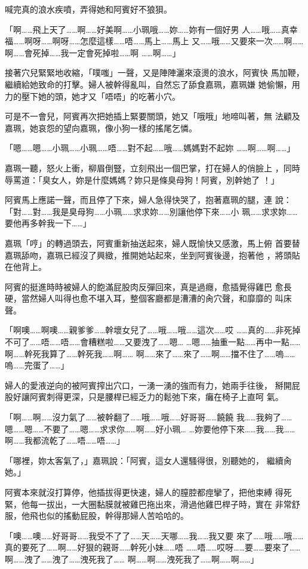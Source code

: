 喊完真的浪水疾噴，弄得她和阿賓好不狼狽。

「啊……飛上天了……啊……好美啊……小珮哦……妳……妳有一個好男
人……哦……真幸福……啊呀……啊呀……怎麼這樣……唔……馬上……馬上
又……哦……又要來一次……啊……啊……會死掉……我一定會死掉啦……啊
……啊……」

接著穴兒緊緊地收縮，「噗嗤」一聲，又是陣陣灑來滾燙的浪水，阿賓快
馬加鞭，繼續給她致命的打擊。婦人被幹得亂叫，自然忘了舔食嘉珮，嘉珮嫌
她偷懶，用力的壓下她的頭，她才又「唔唔」的吃著小穴。

可是不一會兒，阿賓再次把她插上緊要關頭，她又「哦哦」地啼叫著，無
法顧及嘉珮，她哀怨的望向嘉珮，像小狗一樣的搖尾乞憐。

「嗯……嗯……小珮……小珮……唔……對不起……哦……媽媽對不起妳
……啊……啊……」

嘉珮一聽，怒火上衝，柳眉倒豎，立刻飛出一個巴掌，打在婦人的俏臉上
，同時辱罵道：「臭女人，妳是什麼媽媽？妳只是條臭母狗！阿賓，別幹她了
！」

阿賓馬上應諾一聲，而且停了下來，婦人急得快哭了，抱著嘉珮的腿，連
說：「對……對……我是臭母狗……小珮……求求妳……別讓他停下來……小
珮……求求妳……要他再多幹我一下……」

嘉珮「哼」的轉過頭去，阿賓重新抽送起來，婦人既愉快又感激，馬上俯
首要替嘉珮舔吻，嘉珮已經沒了興緻，推開她站起來，坐到阿賓後邊，抱著他
，將頭貼在他背上。

阿賓的挺進時時被婦人的飽滿屁股肉反彈回來，真是過癮，愈插覺得雞巴
愈長硬，當然婦人叫得也愈不堪入耳，整個客廳都是漕漕的肏穴聲，和靡靡的
叫床聲。

「啊噢……啊噢……親爹爹……幹壞女兒了……哦……哦……這次……哎
……真的……非死掉不可了……唔……唔……會糟糕啦……又要洩了……嗯…
…嗯……抽重一點……再中一點……啊……幹死我算了……幹死我……啊……
啊……來了……來了……啊……擋不住了……嗚……嗚……完蛋了……」

婦人的愛液逆向的被阿賓搾出穴口，一湧一湧的強而有力，她兩手往後，
掰開屁股好讓阿賓刺得更深，只是腰桿已經乏力的鬆弛下來，癱在椅子上直呵
氣。

「啊……啊……沒力氣了……被幹翻了……哦……哦……好哥哥……饒饒
我……我夠了……嗯……嗯……不要了……嗯……求求你……啊……好小珮…
…妳要他停下來……我……我……啊……我都流乾了……唔……唔……」

「哪裡，妳太客氣了，」嘉珮說：「阿賓，這女人還騷得很，別聽她的，
繼續肏她。」

阿賓本來就沒打算停，他插拔得更快速，婦人的膣腔都痙攣了，把他束縛
得死緊，他每一拔出，一大圈黏膜就被雞巴拖出來，滑過他雞巴桿子時，實在
非常舒服，他飛也似的搖動屁股，幹得那婦人苦哈哈的。

「噢……噢……好哥哥……我受不了了……天……天哪……我……我又要
來了……哦……哦……真的要死了……啊……好狠的親哥……幹死小妹……唔
……唔……哎呀……要……要來了……啊……洩了……洩了……洩死我了……
啊……啊……洩死我了……啊……啊……」

